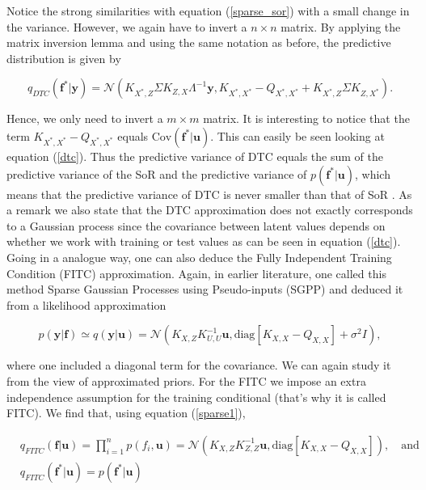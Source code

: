 \documentclass[12pt,a4paper,oneside]{book}
\begin{document}
Notice the strong similarities with equation (\ref{sparse_sor}) with a small change in the variance. However, we again have to invert a $n \times n$ matrix. By applying the matrix inversion lemma and using the same notation as before, the predictive distribution is given by

\begin{equation}\label{pred_DTC}
\boxed{
q_{DTC} (\bm{f}^{\ast} | \bm{y} ) = \mathcal{N}( K_{X^{\ast},Z} \Sigma K_{Z,X} \Lambda^{-1} \bm{y},   K_{X^{\ast},X^{\ast}} - Q_{X^{\ast},X^{\ast}} + K_{X^{\ast},Z} \Sigma K_{Z,X^{\ast}} ).}
\end{equation}

Hence, we only need to invert a $m \times m$ matrix. It is interesting to notice that the term $K_{X^{\ast},X^{\ast}} - Q_{X^{\ast},X^{\ast}}$ equals $\text{Cov}(\bm{f}^{\ast}|\bm{u})$. This can easily be seen looking at equation (\ref{dtc}). Thus the predictive variance of DTC equals the sum of the predictive variance of the SoR and the predictive variance of $p(\bm{f}^{\ast}|\bm{u})$, which means that the predictive variance of DTC is never smaller than that of SoR . As a remark we also state that the DTC approximation does not exactly corresponds to a Gaussian process since the covariance between latent values depends on whether we work with training or test values as can be seen in equation (\ref{dtc}).
Going in a analogue way, one can also deduce the Fully Independent Training Condition (FITC) approximation. Again, in earlier literature, one called this method Sparse Gaussian Processes using Pseudo-inputs (SGPP) and deduced it from a likelihood approximation 

\begin{equation}
p(\bm{y}|\bm{f}) \simeq q(\bm{y}|\bm{u}) = \mathcal{N}(K_{X,Z} K^{-1}_{U, U} \bm{u}, \text{diag}[K_{X,X}- Q_{X,X}] + \sigma^2 I),
\end{equation}

where one included a diagonal term for the covariance. We can again study it from the view of approximated priors. For the FITC we impose an extra independence assumption for the training  conditional (that's why it is called FITC). We find that, using equation (\ref{sparse1}), 

\begin{equation}
\begin{aligned}
&q_{FITC}(\bm{f}|\bm{u}) = \prod_{i=1}^{n} p(f_i,\bm{u})= \mathcal{N}(K_{X,Z} K^{-1}_{Z,Z} \bm{u} , \text{diag}[K_{X,X} - Q_{X,X}]), \quad \text{and} \quad \\
&q_{FITC}(\bm{f}^{\ast} | \bm{u}) = p(\bm{f}^{\ast}|\bm{u})
\end{aligned}
\end{equation}
\end{document}
